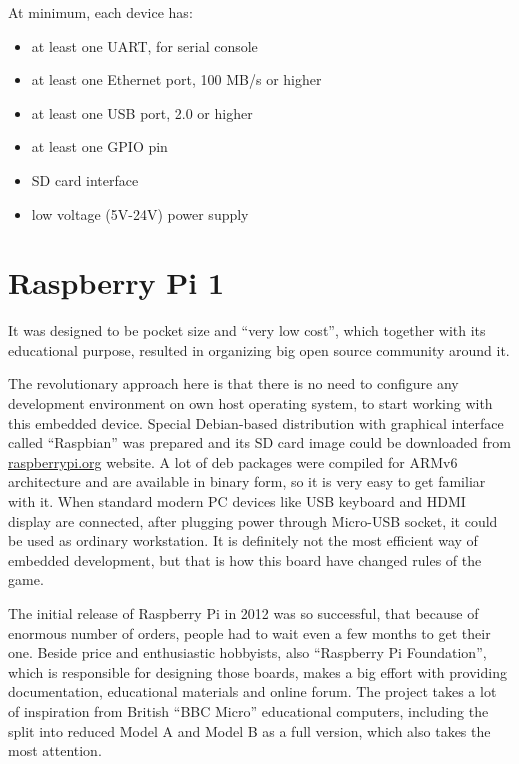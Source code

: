 \documentclass[printmode]{mgr}
\begin{document}
At minimum, each device has:
\begin{itemize}
  \item at least one UART, for serial console
  \item at least one Ethernet port, 100 MB/s or higher
  \item at least one USB port, 2.0 or higher
  \item at least one GPIO pin
  \item SD card interface
  \item low voltage (5V-24V) power supply
\end{itemize}



\section{Raspberry Pi 1}


It was designed to be pocket size and ``very low cost''\cite{web:raspberrypi-lowcost}, which together with its educational purpose, resulted in organizing big open source community around it.

The revolutionary approach here is that there is no need to configure any development environment on own host operating system, to start working with this embedded device.
Special Debian-based distribution with graphical interface called ``Raspbian'' was prepared and its SD card image could be downloaded from \url{raspberrypi.org} website.
A lot of deb packages were compiled for ARMv6 architecture and are available in binary form, so it is very easy to get familiar with it.\cite{web:raspberrypi-raspbian}
When standard modern PC devices like USB keyboard and HDMI display are connected, after plugging power through Micro-USB socket, it could be used as ordinary workstation.
It is definitely not the most efficient way of embedded development, but that is how this board have changed rules of the game.

The initial release of Raspberry Pi in 2012 was so successful, that because of enormous number of orders, people had to wait even a few months to get their one. 
Beside price and enthusiastic hobbyists, also ``Raspberry Pi Foundation'', which is responsible for designing those boards, makes a big effort with providing documentation, educational materials and online forum.\cite{web:raspberrypi-forum}
The project takes a lot of inspiration from British ``BBC Micro'' educational computers, including the split into reduced Model A and Model B as a full version, which also takes the most attention.
\end{document}
